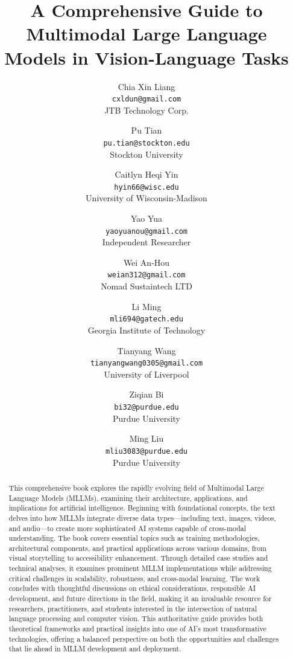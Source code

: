 \documentclass[letterpaper, oneside]{memoir}
\title{A Comprehensive Guide to Multimodal Large Language Models in Vision-Language Tasks}
\author{
    Chia Xin Liang \\ \texttt{cxldun@gmail.com} \\ JTB Technology Corp. \\
    \and
    Pu Tian \\ \texttt{pu.tian@stockton.edu} \\ Stockton University \\
    \and
    Caitlyn Heqi Yin \\ \texttt{hyin66@wisc.edu} \\ University of Wisconsin-Madison \\
    \and
    Yao Yua \\ \texttt{yaoyuanou@gmail.com} \\ Independent Researcher \\
    \and
    Wei An-Hou \\ \texttt{weian312@gmail.com} \\ Nomad Sustaintech LTD \\
    \and
    Li Ming \\ \texttt{mli694@gatech.edu} \\ Georgia Institute of Technology \\
    \and
    Tianyang Wang \\ \texttt{tianyangwang0305@gmail.com} \\ University of Liverpool \\
    \and
    Ziqian Bi \\
    \texttt{bi32@purdue.edu} \\ Purdue University \\
    \and
    Ming Liu \\
        \texttt{mliu3083@purdue.edu} \\ Purdue University 
}
\begin{document}
\date{}
\maketitle

\begin{abstract}
    This comprehensive book explores the rapidly evolving field of Multimodal Large Language Models (MLLMs), examining their architecture, applications, and implications for artificial intelligence. Beginning with foundational concepts, the text delves into how MLLMs integrate diverse data types—including text, images, videos, and audio—to create more sophisticated AI systems capable of cross-modal understanding. The book covers essential topics such as training methodologies, architectural components, and practical applications across various domains, from visual storytelling to accessibility enhancement. Through detailed case studies and technical analyses, it examines prominent MLLM implementations while addressing critical challenges in scalability, robustness, and cross-modal learning. The work concludes with thoughtful discussions on ethical considerations, responsible AI development, and future directions in the field, making it an invaluable resource for researchers, practitioners, and students interested in the intersection of natural language processing and computer vision. This authoritative guide provides both theoretical frameworks and practical insights into one of AI’s most transformative technologies, offering a balanced perspective on both the opportunities and challenges that lie ahead in MLLM development and deployment.
\end{abstract}
\newpage

\tableofcontents



  
  
%  
  
  
  
  
  
  



 
\end{document}
